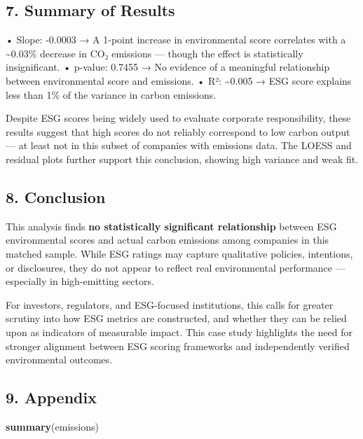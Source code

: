 \documentclass[
]{article}
\newenvironment{Shaded}{\begin{snugshade}}{\end{snugshade}}
\newcommand{\FunctionTok}[1]{\textcolor[rgb]{0.13,0.29,0.53}{\textbf{#1}}}
\newcommand{\NormalTok}[1]{#1}
\begin{document}
\hypertarget{summary-of-results}{%
\subsection{7. Summary of Results}\label{summary-of-results}}

• Slope: -0.0003 → A 1-point increase in environmental score correlates
with a \textasciitilde0.03\% decrease in CO₂ emissions --- though the
effect is statistically insignificant. • p-value: 0.7455 → No evidence
of a meaningful relationship between environmental score and emissions.
• R²: \textasciitilde0.005 → ESG score explains less than 1\% of the
variance in carbon emissions.

Despite ESG scores being widely used to evaluate corporate
responsibility, these results suggest that high scores do not reliably
correspond to low carbon output --- at least not in this subset of
companies with emissions data. The LOESS and residual plots further
support this conclusion, showing high variance and weak fit.

\hypertarget{conclusion}{%
\subsection{8. Conclusion}\label{conclusion}}

This analysis finds \textbf{no statistically significant relationship}
between ESG environmental scores and actual carbon emissions among
companies in this matched sample. While ESG ratings may capture
qualitative policies, intentions, or disclosures, they do not appear to
reflect real environmental performance --- especially in high-emitting
sectors.

For investors, regulators, and ESG-focused institutions, this calls for
greater scrutiny into how ESG metrics are constructed, and whether they
can be relied upon as indicators of measurable impact. This case study
highlights the need for stronger alignment between ESG scoring
frameworks and independently verified environmental outcomes.

\hypertarget{appendix}{%
\subsection{9. Appendix}\label{appendix}}

\begin{Shaded}
\begin{Highlighting}[]
\FunctionTok{summary}\NormalTok{(emissions)}
\end{Highlighting}
\end{Shaded}
\end{document}
